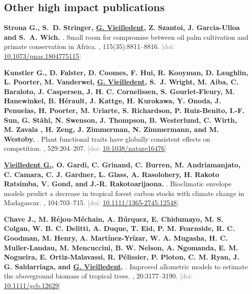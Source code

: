 \documentclass[10pt,a4paper,sans]{moderncv}
\newcounter{enumiv_gv}
\begin{document}
\vspace{0.3cm}
\subsection{Other high impact publications}

\begin{thebibliography}{5}

\setcounter{enumiv}{4}
\textbf{Strona G., S.~D. Stringer, \underline{G. Vieilledent}, Z. Szantoi, J. Garcia-Ulloa and S.~A. Wich.} 
.
\newblock Small room for compromise between oil palm cultivation and primate conservation in Africa.
, 115(35):8811--8816.
\newblock \textcolor{gray}{[doi: \href{https://doi.org/10.1073/pnas.1804775115}{10.1073/pnas.1804775115}]}

\setcounter{enumiv}{3}
\textbf{Kunstler G., D. Falster, D. Coomes, F. Hui, R. Kooyman, D. Laughlin, L. Poorter, M. Vanderwel, \underline{G. Vieilledent}, S.~J. Wright, M. Aiba, C. Baraloto, J. Caspersen, J. H. C. Cornelissen, S. Gourlet-Fleury, M. Hanewinkel, B. Hérault, J. Kattge, H. Kurokawa, Y. Onoda, J. Penuelas, H. Poorter, M. Uriarte, S. Richardson, P. Ruiz-Benito, I.-F. Sun, G. Ståhl, N. Swenson, J. Thompson, B. Westerlund, C. Wirth, M. Zavala , H. Zeng, J. Zimmerman, N. Zimmermann, and M. Westoby.} 
.
\newblock Plant functional traits have globally consistent effects on competition.
, 529:204--207.
\newblock \textcolor{gray}{[doi: \href{http://dx.doi.org/10.1038/nature16476}{10.1038/nature16476}]}

\setcounter{enumiv}{2}
\textbf{\underline{Vieilledent G.}, O. Gardi, C. Grinand, C. Burren, M. Andriamanjato, C. Camara, C. J. Gardner, L. Glass, A. Rasolohery, H. Rakoto Ratsimba, V. Gond, and J.-R. Rakotoarijaona.} 
.
\newblock Bioclimatic envelope models predict a decrease in tropical forest carbon stocks with climate change in Madagascar.
, 104:703--715.
\newblock \textcolor{gray}{[doi: \href{http://dx.doi.org/10.1111/1365-2745.12548}{10.1111/1365-2745.12548}]}

\setcounter{enumiv}{1}
\textbf{Chave J., M. Réjou-Méchain, A. Búrquez, E. Chidumayo, M. S. Colgan, W. B. C. Delitti, A. Duque, T. Eid, P. M. Fearnside, R. C. Goodman, M. Henry, A. Martínez-Yrízar, W. A. Mugasha, H. C. Muller-Landau, M. Mencuccini, B. W. Nelson, A. Ngomanda, E. M. Nogueira, E. Ortiz-Malavassi, R. Pélissier, P. Ploton, C. M. Ryan, J. G. Saldarriaga, and \underline{G. Vieilledent}.} 
.
\newblock Improved allometric models to estimate the aboveground biomass of tropical trees. 
, 20:3177--3190.
\newblock \textcolor{gray}{[doi: \href{http://dx.doi.org/10.1111/gcb.12629}{10.1111/gcb.12629}]}


\end{thebibliography}
\end{document}
